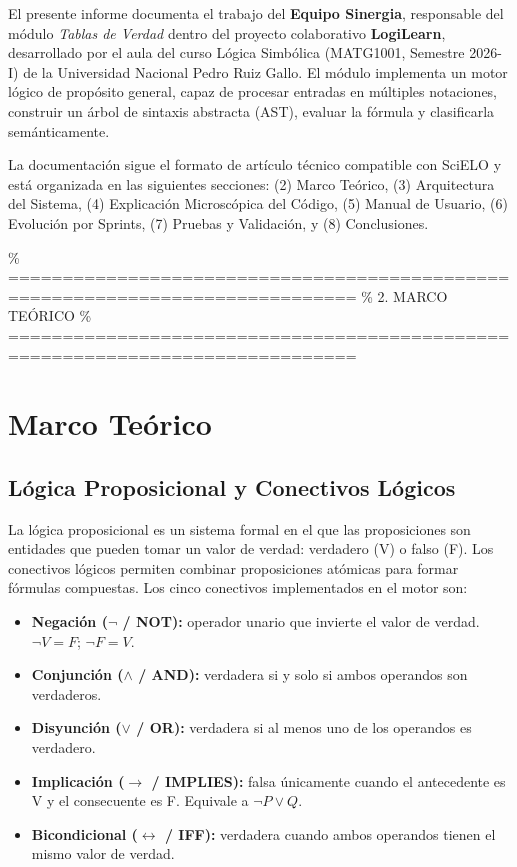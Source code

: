 \documentclass[11pt,a4paper]{article}
\begin{document}
El presente informe documenta el trabajo del \textbf{Equipo Sinergia}, responsable del módulo \textit{Tablas de Verdad} dentro del proyecto colaborativo \textbf{LogiLearn}, desarrollado por el aula del curso Lógica Simbólica (MATG1001, Semestre 2026-I) de la Universidad Nacional Pedro Ruiz Gallo. El módulo implementa un motor lógico de propósito general, capaz de procesar entradas en múltiples notaciones, construir un árbol de sintaxis abstracta (AST), evaluar la fórmula y clasificarla semánticamente.

La documentación sigue el formato de artículo técnico compatible con SciELO y está organizada en las siguientes secciones: (2) Marco Teórico, (3) Arquitectura del Sistema, (4) Explicación Microscópica del Código, (5) Manual de Usuario, (6) Evolución por Sprints, (7) Pruebas y Validación, y (8) Conclusiones.

\% ==============================================================================
\% 2. MARCO TEÓRICO
\% ==============================================================================
\section{Marco Teórico}

\subsection{Lógica Proposicional y Conectivos Lógicos}
La lógica proposicional es un sistema formal en el que las proposiciones son entidades que pueden tomar un valor de verdad: verdadero (V) o falso (F). Los conectivos lógicos permiten combinar proposiciones atómicas para formar fórmulas compuestas. Los cinco conectivos implementados en el motor son:
\begin{itemize}[leftmargin=*]
  \item \textbf{Negación ($\neg$ / NOT):} operador unario que invierte el valor de verdad. $\neg V = F$; $\neg F = V$.
  \item \textbf{Conjunción ($\land$ / AND):} verdadera si y solo si ambos operandos son verdaderos.
  \item \textbf{Disyunción ($\lor$ / OR):} verdadera si al menos uno de los operandos es verdadero.
  \item \textbf{Implicación ($\to$ / IMPLIES):} falsa únicamente cuando el antecedente es V y el consecuente es F. Equivale a $\neg P \lor Q$.
  \item \textbf{Bicondicional ($\leftrightarrow$ / IFF):} verdadera cuando ambos operandos tienen el mismo valor de verdad.
\end{itemize}
\end{document}
